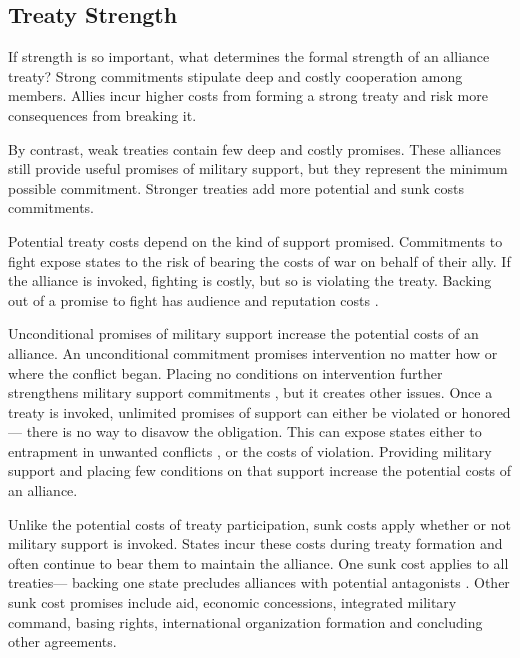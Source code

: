\documentclass[12pt]{article}
\begin{document}
\subsection{Treaty Strength}


If strength is so important, what determines the formal strength of an alliance treaty? 
Strong commitments stipulate deep and costly cooperation among members.
Allies incur higher costs from forming a strong treaty and risk more consequences from breaking it. 


By contrast, weak treaties contain few deep and costly promises. 
These alliances still provide useful promises of military support, but they represent the minimum possible commitment. 
Stronger treaties add more potential and sunk costs commitments. 


Potential treaty costs depend on the kind of support promised. 
Commitments to fight expose states to the risk of bearing the costs of war on behalf of their ally. 
If the alliance is invoked, fighting is costly, but so is violating the treaty. 
Backing out of a promise to fight has audience \citep{Levyetal2015} and reputation costs \citep{Gibler2008, Crescenzietal2012, Mattes2012}. 


Unconditional promises of military support increase the potential costs of an alliance. 
An unconditional commitment promises intervention no matter how or where the conflict began. 
Placing no conditions on intervention further strengthens military support commitments , but it creates other issues. 
Once a treaty is invoked, unlimited promises of support can either be violated or honored--- there is no way to disavow the obligation. 
This can expose states either to entrapment in unwanted conflicts \citep{Snyder1990, Benson2012}, or the costs of violation. 
Providing military support and placing few conditions on that support increase the potential costs of an alliance. 


Unlike the potential costs of treaty participation, sunk costs apply whether or not military support is invoked. 
States incur these costs during treaty formation and often continue to bear them to maintain the alliance. 
One sunk cost applies to all treaties--- backing one state precludes alliances with potential antagonists \citep{Snyder1997}. 
Other sunk cost promises include aid, economic concessions, integrated military command, basing rights, international organization formation and concluding other agreements. 
\end{document}
